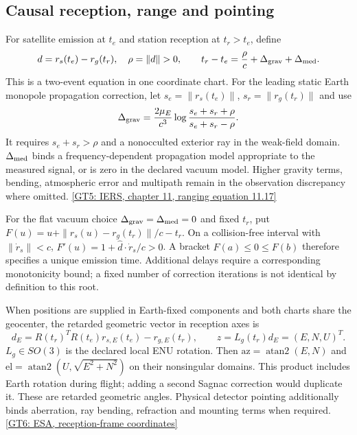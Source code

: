 \subsection{Causal reception, range and pointing}
For satellite emission at $t_e$ and station reception at $t_r>t_e$, define
\begin{equation}
 d=r_s(t_e)-r_g(t_r),\quad \rho=\|d\|>0,\qquad
 t_r-t_e=\frac{\rho}{c}+\Delta_{\rm grav}+\Delta_{\rm med} .
 \label{r14-light-time}
\end{equation}
This is a two-event equation in one coordinate chart. For the leading static
Earth monopole propagation correction, let $s_e=\|r_s(t_e)\|$,
$s_r=\|r_g(t_r)\|$ and use
\begin{equation}
 \Delta_{\rm grav}=\frac{2\mu_E}{c^3}
 \log\frac{s_e+s_r+\rho}{s_e+s_r-\rho} .
 \label{r14-shapiro}
\end{equation}
It requires $s_e+s_r>\rho$ and a nonocculted exterior ray in the weak-field
domain. $\Delta_{\rm med}$ binds a frequency-dependent propagation model
appropriate to the measured signal, or is zero in the declared vacuum model.
Higher gravity terms, bending, atmospheric error and multipath remain in the
observation discrepancy where omitted.
\href{https://iers-conventions.obspm.fr/content/chapter11/tn36_c11.pdf}{[GT5: IERS, chapter 11, ranging equation 11.17]}

For the flat vacuum choice $\Delta_{\rm grav}=\Delta_{\rm med}=0$ and fixed
$t_r$, put $F(u)=u+\|r_s(u)-r_g(t_r)\|/c-t_r$. On a collision-free interval
with $\|\dot r_s\|<c$, $F'(u)=1+\hat d\cdot\dot r_s/c>0$.
A bracket $F(a)\leq0\leq F(b)$ therefore specifies a unique emission time.
Additional delays require a corresponding monotonicity bound; a fixed number
of correction iterations is not identical by definition to this root.

When positions are supplied in Earth-fixed components and both charts share
the geocenter, the retarded geometric vector in reception axes is
\begin{equation}
 d_E=R(t_r)^TR(t_e)r_{s,E}(t_e)-r_{g,E}(t_r),\qquad
 z=L_g(t_r)d_E=(E,N,U)^T .
 \label{r14-retarded-station}
\end{equation}
$L_g\in SO(3)$ is the declared local ENU rotation. Then
$\mathrm{az}=\operatorname{atan2}(E,N)$ and
$\mathrm{el}=\operatorname{atan2}(U,\sqrt{E^2+N^2})$ on their nonsingular
domains. This product includes Earth rotation during flight; adding a second
Sagnac correction would duplicate it. These are retarded geometric angles.
Physical detector pointing additionally binds aberration, ray bending,
refraction and mounting terms when required.
\href{https://gssc.esa.int/navipedia/index.php/Satellite_Coordinates_Computation}{[GT6: ESA, reception-frame coordinates]}

